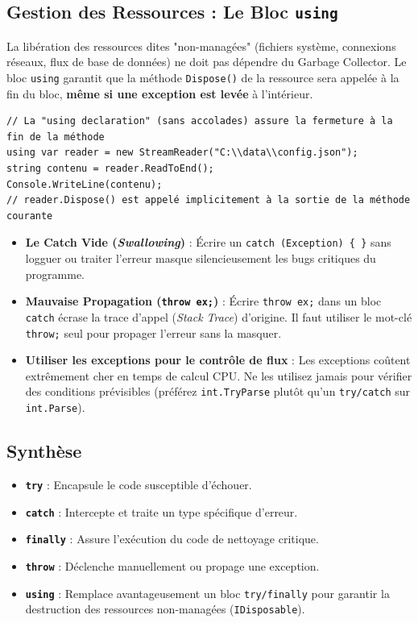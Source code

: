 \subsection{Gestion des Ressources : Le Bloc \texttt{using}}

La libération des ressources dites "non-managées" (fichiers système, connexions réseaux, flux de base de données) ne doit pas dépendre du Garbage Collector. Le bloc \texttt{using} garantit que la méthode \texttt{Dispose()} de la ressource sera appelée à la fin du bloc, \textbf{même si une exception est levée} à l'intérieur.

\begin{lstlisting}[style=csharpstyle]
// La "using declaration" (sans accolades) assure la fermeture à la fin de la méthode
using var reader = new StreamReader("C:\\data\\config.json");
string contenu = reader.ReadToEnd();
Console.WriteLine(contenu);
// reader.Dispose() est appelé implicitement à la sortie de la méthode courante
\end{lstlisting}

\begin{tcolorbox}[colback=backcolour,colframe=keywordcolor,title=\textbf{Pièges Courants \& Anti-Patterns}]
\begin{itemize}
    \item \textbf{Le Catch Vide (\textit{Swallowing})} : Écrire un \texttt{catch (Exception) \{ \}} sans logguer ou traiter l'erreur masque silencieusement les bugs critiques du programme.
    \item \textbf{Mauvaise Propagation (\texttt{throw ex;})} : Écrire \texttt{throw ex;} dans un bloc \texttt{catch} écrase la trace d'appel (\textit{Stack Trace}) d'origine. Il faut utiliser le mot-clé \texttt{throw;} seul pour propager l'erreur sans la masquer.
    \item \textbf{Utiliser les exceptions pour le contrôle de flux} : Les exceptions coûtent extrêmement cher en temps de calcul CPU. Ne les utilisez jamais pour vérifier des conditions prévisibles (préférez \texttt{int.TryParse} plutôt qu'un \texttt{try/catch} sur \texttt{int.Parse}).
\end{itemize}
\end{tcolorbox}

\subsection{Synthèse}
\begin{itemize}
    \item \textbf{\texttt{try}} : Encapsule le code susceptible d'échouer.
    \item \textbf{\texttt{catch}} : Intercepte et traite un type spécifique d'erreur.
    \item \textbf{\texttt{finally}} : Assure l'exécution du code de nettoyage critique.
    \item \textbf{\texttt{throw}} : Déclenche manuellement ou propage une exception.
    \item \textbf{\texttt{using}} : Remplace avantageusement un bloc \texttt{try/finally} pour garantir la destruction des ressources non-managées (\texttt{IDisposable}).
\end{itemize}
